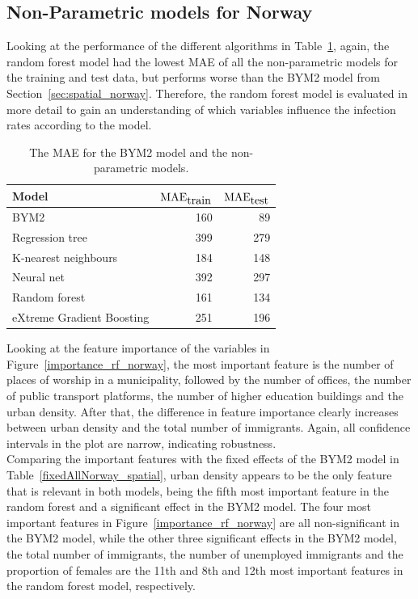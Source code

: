 \subsection{Non-Parametric models for Norway}
Looking at the performance of the different algorithms in Table~\ref{pred_perf_norway}, again, the random forest model had the lowest MAE of all the non-parametric models for the training and test data, but performs worse than the BYM2 model from Section~\ref{sec:spatial_norway}. Therefore, the random forest model is evaluated in more detail to gain an understanding of which variables influence the infection rates according to the model. \clearpage
\begin{table}[H] 
\caption{The MAE for the BYM2 model and the non-parametric models. \label{pred_perf_norway}}
\begin{tabular}{l r r}
\toprule
\textbf{Model}	& \textbf{$\hbox{MAE}_{\hbox{train}}$} & \textbf{$\hbox{MAE}_{\hbox{test}}$}\\
\midrule
BYM2 & 160 & 89\\
Regression tree & 399 & 279 \\
K-nearest neighbours & 184 & 148 \\
Neural net & 392 & 297 \\
Random forest & 161 & 134 \\
eXtreme Gradient Boosting & 251 & 196 \\
\bottomrule
\end{tabular}
\end{table}
Looking at the feature importance of the variables in Figure~\ref{importance_rf_norway}, the most important feature is the number of places of worship in a municipality, followed by the number of offices, the number of public transport platforms, the number of higher education buildings and the urban density. After that, the difference in feature importance clearly increases between urban density and the total number of immigrants. Again, all confidence intervals in the plot are narrow, indicating robustness. \\
Comparing the important features with the fixed effects of the BYM2 model in Table~\ref{fixedAllNorway_spatial}, urban density appears to be the only feature that is relevant in both models, being the fifth most important feature in the random forest and a significant effect in the BYM2 model. The four most important features in Figure~\ref{importance_rf_norway} are all non-significant in the BYM2 model, while the other three significant effects in the BYM2 model, the total number of immigrants, the number of unemployed immigrants and the proportion of females are the 11th and 8th and 12th most important features in the random forest model, respectively. \clearpage
